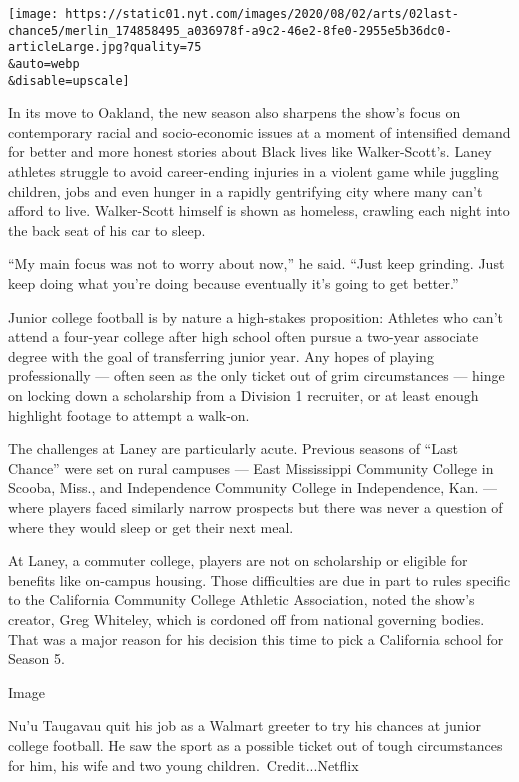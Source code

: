 \texttt{[image: https://static01.nyt.com/images/2020/08/02/arts/02last-chance5/merlin\_174858495\_a036978f-a9c2-46e2-8fe0-2955e5b36dc0-articleLarge.jpg?quality=75\\\&auto=webp\\\&disable=upscale]}

In its move to Oakland, the new season also sharpens the show's focus on
contemporary racial and socio-economic issues at a moment of intensified
demand for better and more honest stories about Black lives like
Walker-Scott's. Laney athletes struggle to avoid career-ending injuries
in a violent game while juggling children, jobs and even hunger in a
rapidly gentrifying city where many can't afford to live. Walker-Scott
himself is shown as homeless, crawling each night into the back seat of
his car to sleep.

``My main focus was not to worry about now,'' he said. ``Just keep
grinding. Just keep doing what you're doing because eventually it's
going to get better.''

Junior college football is by nature a high-stakes proposition: Athletes
who can't attend a four-year college after high school often pursue a
two-year associate degree with the goal of transferring junior year. Any
hopes of playing professionally --- often seen as the only ticket out of
grim circumstances --- hinge on locking down a scholarship from a
Division 1 recruiter, or at least enough highlight footage to attempt a
walk-on.

The challenges at Laney are particularly acute. Previous seasons of
``Last Chance'' were set on rural campuses --- East Mississippi
Community College in Scooba, Miss., and Independence Community College
in Independence, Kan. --- where players faced similarly narrow prospects
but there was never a question of where they would sleep or get their
next meal.

At Laney, a commuter college, players are not on scholarship or eligible
for benefits like on-campus housing. Those difficulties are due in part
to rules specific to the California Community College Athletic
Association, noted the show's creator, Greg Whiteley, which is cordoned
off from national governing bodies. That was a major reason for his
decision this time to pick a California school for Season 5.

Image

Nu'u Taugavau quit his job as a Walmart greeter to try his chances at
junior college football. He saw the sport as a possible ticket out of
tough circumstances for him, his wife and two young
children.~Credit...Netflix

